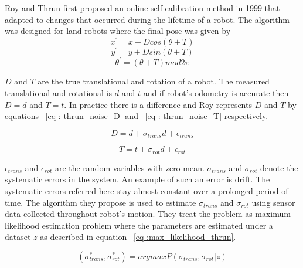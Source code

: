 \documentclass[12pt]{dalcsthesis}
\begin{document}
Roy and Thrun first proposed an online self-calibration method \cite{Roy} in 1999 that adapted to changes that occurred during the lifetime of a robot. The algorithm was designed for land robots where the final pose was given by
\begin{equation}
x^{'}=x+Dcos(\theta+T)
\end{equation}
\begin{equation}
y^{'}=y+Dsin(\theta+T)
\end{equation}
\begin{equation}
\theta^{'}=(\theta+T)mod2\pi
\end{equation}

$D$ and $T$ are the true translational and rotation of a robot. The measured translational and rotational is $d$ and $t$ and if robot's odometry is accurate then $D=d$ and $T=t$. In practice there is a difference and Roy represents $D$ and $T$ by equations ~\ref{eq-: thrun_noise_D} and ~\ref{eq-: thrun_noise_T} respectively.

\begin{equation}
\label{eq-: thrun_noise_D}
D= d+ \sigma_{trans}d+\epsilon_{trans}
\end{equation}

\begin{equation}
\label{eq-: thrun_noise_T}
  T= t+ \sigma_{rot}d+\epsilon_{rot}
\end{equation}

$\epsilon_{trans}$ and $\epsilon_{rot}$ are the random variables with zero mean. $\sigma_{trans}$ and $\sigma_{rot}$ denote the systematic errors in the system. An example of such an error is drift. The systematic errors referred here stay almost constant over a prolonged period of time. The algorithm they propose is used to estimate $\sigma_{trans}$ and $\sigma_{rot}$ using sensor data collected throughout robot's motion. They treat the problem as maximum likelihood estimation problem where the parameters are estimated under a dataset $z$ as described in equation ~\ref{eq-:max_likelihood_thrun}.

\begin{equation}
\label{eq-:max_likelihood_thrun}
 (\sigma_{trans}^{*},\sigma_{rot}^{*}) = argmax P(\sigma_{trans},\sigma_{rot}|z)
\end{equation}
\end{document}
